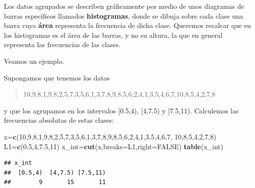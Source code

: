 \documentclass[]{book}
\newenvironment{Shaded}{\begin{snugshade}}{\end{snugshade}}
\newcommand{\DataTypeTok}[1]{\textcolor[rgb]{0.13,0.29,0.53}{#1}}
\newcommand{\DecValTok}[1]{\textcolor[rgb]{0.00,0.00,0.81}{#1}}
\newcommand{\FloatTok}[1]{\textcolor[rgb]{0.00,0.00,0.81}{#1}}
\newcommand{\KeywordTok}[1]{\textcolor[rgb]{0.13,0.29,0.53}{\textbf{#1}}}
\newcommand{\NormalTok}[1]{#1}
\newcommand{\OtherTok}[1]{\textcolor[rgb]{0.56,0.35,0.01}{#1}}
\theoremstyle{definition}
\theoremstyle{definition}
\theoremstyle{definition}
\theoremstyle{remark}
\let\BeginKnitrBlock\begin \let\EndKnitrBlock\end
\begin{document}
Los datos agrupados se describen gráficamente por medio de unos diagramas de barras específicos llamados \textbf{histogramas}, donde se dibuja sobre cada clase una barra cuya \textbf{área} representa la frecuencia de dicha clase. Queremos recalcar que en los histogramas es el área de las barras, y no su altura, la que en general representa las frecuencias de las clases.

Veamos un ejemplo.

\BeginKnitrBlock{example}
\protect\hypertarget{exm:1115}{}{\label{exm:1115} }Supongamos que tenemos los datos
\EndKnitrBlock{example}

\begin{quote}
10,9,8,1,9,8,2,5,7,3,5,6,1,3,7,8,9,8,5,6,2,4,1,3,5,4,6,7,10,8,5,4,2,7,8
\end{quote}

y que los agrupamos en los intervalos {[}0.5,4), {[}4,7.5) y {[}7.5,11).
Calculemos las frecuencias absolutas de estas clases:

\begin{Shaded}
\begin{Highlighting}[]
\NormalTok{x=}\KeywordTok{c}\NormalTok{(}\DecValTok{10}\NormalTok{,}\DecValTok{9}\NormalTok{,}\DecValTok{8}\NormalTok{,}\DecValTok{1}\NormalTok{,}\DecValTok{9}\NormalTok{,}\DecValTok{8}\NormalTok{,}\DecValTok{2}\NormalTok{,}\DecValTok{5}\NormalTok{,}\DecValTok{7}\NormalTok{,}\DecValTok{3}\NormalTok{,}\DecValTok{5}\NormalTok{,}\DecValTok{6}\NormalTok{,}\DecValTok{1}\NormalTok{,}\DecValTok{3}\NormalTok{,}\DecValTok{7}\NormalTok{,}\DecValTok{8}\NormalTok{,}\DecValTok{9}\NormalTok{,}\DecValTok{8}\NormalTok{,}\DecValTok{5}\NormalTok{,}\DecValTok{6}\NormalTok{,}\DecValTok{2}\NormalTok{,}\DecValTok{4}\NormalTok{,}\DecValTok{1}\NormalTok{,}\DecValTok{3}\NormalTok{,}\DecValTok{5}\NormalTok{,}\DecValTok{4}\NormalTok{,}\DecValTok{6}\NormalTok{,}\DecValTok{7}\NormalTok{,}
  \DecValTok{10}\NormalTok{,}\DecValTok{8}\NormalTok{,}\DecValTok{5}\NormalTok{,}\DecValTok{4}\NormalTok{,}\DecValTok{2}\NormalTok{,}\DecValTok{7}\NormalTok{,}\DecValTok{8}\NormalTok{)}
\NormalTok{L1=}\KeywordTok{c}\NormalTok{(}\FloatTok{0.5}\NormalTok{,}\DecValTok{4}\NormalTok{,}\FloatTok{7.5}\NormalTok{,}\DecValTok{11}\NormalTok{)}
\NormalTok{x_int=}\KeywordTok{cut}\NormalTok{(x,}\DataTypeTok{breaks=}\NormalTok{L1,}\DataTypeTok{right=}\OtherTok{FALSE}\NormalTok{)}
\KeywordTok{table}\NormalTok{(x_int)}
\end{Highlighting}
\end{Shaded}

\begin{verbatim}
## x_int
##  [0.5,4)  [4,7.5) [7.5,11) 
##        9       15       11
\end{verbatim}
\end{document}
